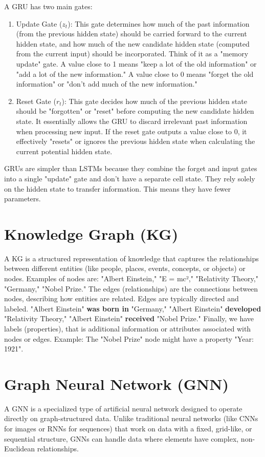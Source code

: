 A GRU has two main gates:
\begin{enumerate}
\item Update Gate ($z_t$​): This gate determines how much of the past
  information (from the previous hidden state) should be carried
  forward to the current hidden state, and how much of the new
  candidate hidden state (computed from the current input) should be
  incorporated. Think of it as a "memory update" gate. A value close
  to 1 means "keep a lot of the old information" or "add a lot of the
  new information." A value close to 0 means "forget the old
  information" or "don't add much of the new information."
\item Reset Gate ($r_t$​): This gate decides how much of the previous
  hidden state should be "forgotten" or "reset" before computing the
  new candidate hidden state. It essentially allows the GRU to discard
  irrelevant past information when processing new input. If the reset
  gate outputs a value close to 0, it effectively "resets" or ignores
  the previous hidden state when calculating the current potential
  hidden state.
\end{enumerate}

GRUs are simpler than LSTMs because they combine the forget and input
gates into a single "update" gate and don't have a separate cell
state. They rely solely on the hidden state to transfer
information. This means they have fewer parameters.

\section{Knowledge Graph (KG)}
A KG is a structured representation of knowledge that captures the
relationships between different entities (like people, places, events,
concepts, or objects) or nodes. Examples of nodes are: "Albert
Einstein," "E = mc²," "Relativity Theory," "Germany," "Nobel Prize."
The edges (relationships) are the connections between nodes,
describing how entities are related. Edges are typically directed and
labeled. "Albert Einstein" \textbf{was born in} "Germany," "Albert
Einstein" \textbf{developed} "Relativity Theory," "Albert Einstein"
\textbf{received} "Nobel Prize." Finally, we have labels (properties),
that is additional information or attributes associated with nodes or
edges. Example: The "Nobel Prize" node might have a property "Year: 1921".

\section{Graph Neural Network (GNN)}
A GNN is a specialized type of artificial neural network designed to
operate directly on graph-structured data. Unlike traditional neural
networks (like CNNs for images or RNNs for sequences) that work on
data with a fixed, grid-like, or sequential structure, GNNs can handle
data where elements have complex, non-Euclidean relationships.


